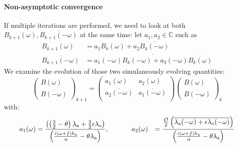 \paragraph{Non-asymptotic convergence}
If multiple iterations are performed, we need to look at both
$B_{k+1}(\omega), \overline{B_{k+1}(-{\omega})}$
at the same time: let $a_1, a_2 \in \mathbb{C}$ such as
\begin{equation}
	\begin{aligned}
		B_{k+1}(\omega) &= a_1 B_{k}(\omega) + a_2
		\overline{B_{k}(-{\omega})}\\
		\overline{B_{k+1}(-{\omega})} &=
		\overline{a_1(-{\omega})
			B_{k}(-{\omega})
		+ {a_2(-{\omega})} \overline{B_{k}(\omega)}}
	\end{aligned}
\end{equation}
We examine the evolution of those two
simulaneously evolving quantities:
\begin{equation}
	\label{eq:OASchwarz_transitionMatrixDD26}
\begin{pmatrix}
	B(\omega) \\
	\overline{B(-{\omega})}
\end{pmatrix}_{k+1}
 =
\begin{pmatrix}
	a_1(\omega) & a_2(\omega) \\
	\overline{a_2(-{\omega})} & \overline{a_1(-{\omega})} \\
\end{pmatrix}
\begin{pmatrix}
	B(\omega) \\
	\overline{B(-{\omega})}
\end{pmatrix}_{k}
\end{equation}
with:
\begin{equation}
\begin{aligned}
    a_1(\omega)
    &= \frac{\left(\left(\frac{3}{2} - \theta\right) 
    \lambda_{\rm a}
    + \frac{3}{2} \epsilon \lambda_{\rm o} \right)}
	{\left(\frac{i(\omega+f)h_{\rm a}}{\alpha} -
		\theta \lambda_{\rm a}\right)}, ~~~~~~~~~~
    a_2(\omega)
    &= \frac{
 \frac{
    \mathcal{O}
    }{2}
    \left(
    \overline{
    \lambda_{\rm a}(-{\omega})
    +
    \epsilon\lambda_{\rm o}(-{\omega})}
    \right)   
    }{\left(\frac{i(\omega+f)h_{\rm a}}{\alpha} - \theta \lambda_{\rm a}\right)}
\end{aligned}
\end{equation}
